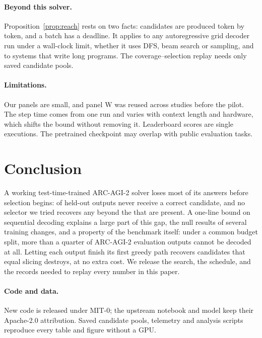 \documentclass[10pt,twocolumn]{article}
\theoremstyle{plain}\newtheorem{proposition}{Proposition}
\theoremstyle{definition}\newtheorem{corollary}{Corollary}
\begin{document}
\paragraph{Beyond this solver.} Proposition~\ref{prop:reach} rests on two facts: candidates are produced token by token, and a batch has a deadline. It applies to any autoregressive grid decoder run under a wall-clock limit, whether it uses DFS, beam search or sampling, and to systems that write long programs. The coverage--selection replay needs only saved candidate pools.

\paragraph{Limitations.} Our panels are small, and panel W was reused across studies before the pilot. The step time comes from one run and varies with context length and hardware, which shifts the bound without removing it. Leaderboard scores are single executions. The pretrained checkpoint may overlap with public evaluation tasks.

\section{Conclusion}
A working test-time-trained ARC-AGI-2 solver loses most of its answers before selection begins: \ConfNoCorrect{} of \ConfOutputs{} held-out outputs never receive a correct candidate, and no selector we tried recovers any beyond the \ConfOracle{} that are present. A one-line bound on sequential decoding explains a large part of this gap, the null results of several training changes, and a property of the benchmark itself: under a common budget split, more than a quarter of ARC-AGI-2 evaluation outputs cannot be decoded at all. Letting each output finish its first greedy path recovers candidates that equal slicing destroys, at no extra cost. We release the search, the schedule, and the records needed to replay every number in this paper.

\paragraph{Code and data.} New code is released under MIT-0; the upstream notebook and model keep their Apache-2.0 attribution. Saved candidate pools, telemetry and analysis scripts reproduce every table and figure without a GPU.
\end{document}
